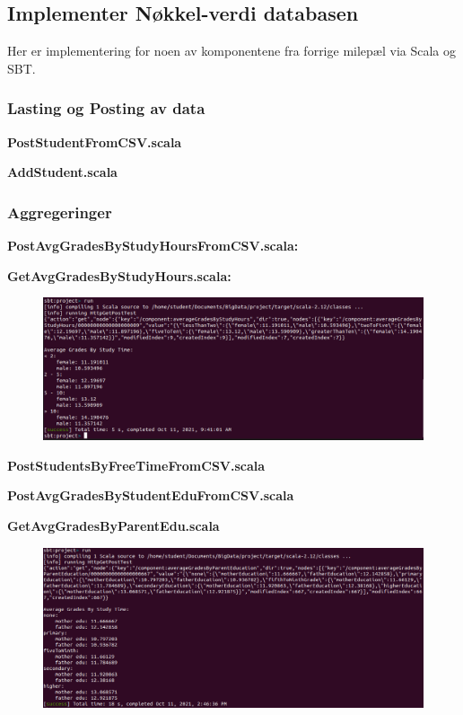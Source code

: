\subsection{Implementer Nøkkel-verdi databasen}
Her er implementering for noen av komponentene fra forrige milepæl via Scala og SBT.

\subsubsection{Lasting og Posting av data}

\textbf{PostStudentFromCSV.scala}\\

\textbf{AddStudent.scala}\\

\subsubsection{Aggregeringer}
\textbf{PostAvgGradesByStudyHoursFromCSV.scala:}\\

\textbf{GetAvgGradesByStudyHours.scala:}\\

\FigureCounter
\begin{figure}[H]
  \centering
  \includegraphics[width=\textwidth]{images/milepael3/GetAvgGradesByStudyHoursTerminal.png}
\end{figure}


\textbf{PostStudentsByFreeTimeFromCSV.scala}\\


\textbf{PostAvgGradesByStudentEduFromCSV.scala}\\

\textbf{GetAvgGradesByParentEdu.scala}\\

\FigureCounter
\begin{figure}[H]
  \centering
  \includegraphics[width=\textwidth]{images/milepael3/GetAvgGradesByParentEduTerminal.png}
\end{figure}



